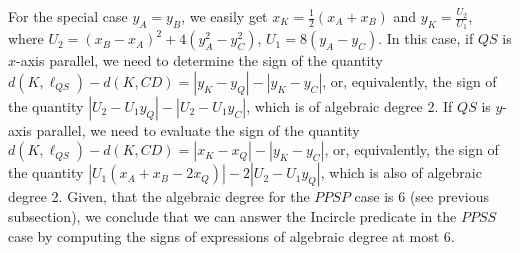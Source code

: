 \documentclass[letterpaper,11pt]{article}
\newcommand{\incircle}{\textsf{Incircle}\xspace}
\newcommand{\ppsp}{$PPSP$\xspace}
\newcommand{\ppss}{$PPSS$\xspace}
\begin{document}
\begin{comment}
\begin{table}[t]
\begin{center}
\begin{tabular}{|c|c|}
\hline
Relative positions of $A$, $B$ and $CD$ & Root of $P(x)$ of interest\\
\hline \hline
 $ y_{C} < y_{A} < y_{B} $ & $x_{1}$\\ \hline
 $ y_{C} < y_{B} < y_{A} $ & $x_{2}$\\ \hline
 $ y_{B}< y_{A}<y_{C} $ & $x_{2}$\\ \hline
 $ y_{A} < y_{B} <y_{C} $& $x_{1}$\\ \hline
\end{tabular}
\end{center}
\caption{The possible relative positions of $A$, $B$ and $CD$ and the
  corresponding root of $P(x)$ of interest (assuming
  $y_A\ne{}y_B$).}\label{Table:xPPS}
\end{table}

\begin{table}[t]
\begin{center}
\begin{tabular}{|c|c|}
\hline
Relative positions of $A$, $B$ & Root of $T(y)$ of interest\\
\hline \hline
$x_{A}<x_{B}$ & $y_{2}$ \\ \hline 
$x_{A}>x_{B}$ & $y_{1}$ \\ \hline 
\end{tabular}
\end{center}
\caption{The possible relative positions of $A$, $B$ and the
  corresponding root of $T(x)$ of interest (assuming
  $y_A \neq y_B$).}\label{Table:yPPS}
\end{table}
\end{comment}

For the special case $y_A=y_B$, we easily get
$x_K=\frac{1}{2}(x_A+x_B)$ and $y_K=\frac{U_2}{U_1}$, where
$U_2 = (x_B-x_A)^2+4(y_A^2-y_C^2)$,
$U_1 = 8(y_A-y_C)$.
In this case, if $QS$ is $x$-axis parallel, we need to determine the
sign of the quantity
$d(K,\ell_{QS})-d(K,CD)=|y_K-y_Q|-|y_K-y_C|$, or, equivalently, the sign
of the quantity $|U_2-U_1y_Q|-|U_2-U_1y_C|$, which is of algebraic
degree 2. If $QS$ is $y$-axis parallel, we need to evaluate the sign
of the quantity $d(K,\ell_{QS})-d(K,CD)=|x_K-x_Q|-|y_K-y_C|$, or,
equivalently, the sign of the quantity
$|U_1(x_A+x_B-2x_Q)|-2|U_2-U_1y_Q|$, which is also of algebraic degree
2. Given, that the algebraic degree for the \ppsp case
is 6 (see previous subsection), 
we conclude that we can answer the \incircle predicate in the \ppss
case by computing the signs of expressions of algebraic degree at most
6.
\end{document}
